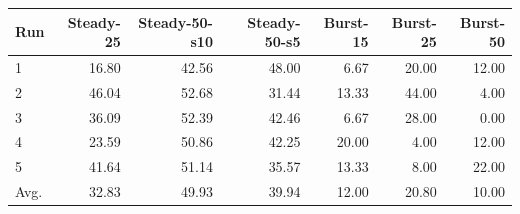 \begin{tabular}{lrrrrrr}
\toprule
Run & Steady-25 & Steady-50-s10 & Steady-50-s5 & Burst-15 & Burst-25 & Burst-50 \\
\midrule
1 & 16.80 & 42.56 & 48.00 & 6.67 & 20.00 & 12.00 \\
2 & 46.04 & 52.68 & 31.44 & 13.33 & 44.00 & 4.00 \\
3 & 36.09 & 52.39 & 42.46 & 6.67 & 28.00 & 0.00 \\
4 & 23.59 & 50.86 & 42.25 & 20.00 & 4.00 & 12.00 \\
5 & 41.64 & 51.14 & 35.57 & 13.33 & 8.00 & 22.00 \\
Avg. & 32.83 & 49.93 & 39.94 & 12.00 & 20.80 & 10.00 \\
\bottomrule
\end{tabular}
